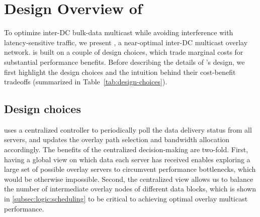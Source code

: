 \section{Design Overview of \name}
\label{sec:overview}

To optimize inter-DC bulk-data multicast while avoiding
interference with latency-sensitive traffic, we present \name,
a near-optimal inter-DC multicast overlay network.
\name is built on a couple of design choices, which
trade marginal costs for substantial performance benefits.
Before describing the details of \name's design, we first
highlight the design choices and the intuition behind
their cost-benefit tradeoffs
(summarized in Table~\ref{tab:design-choices}).



\subsection{Design choices}

\name uses a centralized controller to periodically poll
the data delivery status from all servers, and
updates the overlay path selection and bandwidth allocation
accordingly.
The benefits of the centralized decision-making are
two-fold.
First, having a global view on which data each server has
received enables exploring a large set of possible
overlay servers to circumvent performance bottlenecks,
which would be otherwise impossible.
Second, the centralized view allows us to
balance the number of intermediate overlay nodes of different
data blocks, which is shown in \Section\ref{subsec:logic:scheduling}
to be critical to
achieving optimal overlay multicast performance.



